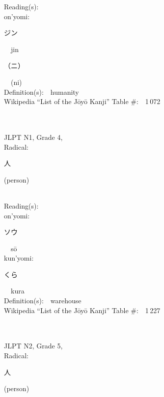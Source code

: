 \begin{multicols}{2}
Reading(s):\ \ \\
{\hspace*{1em}}on'yomi:\ \ \\
{\hspace*{2em}}{\begin{CJK}{UTF8}{min} ジン \end{CJK}}\ \ jin\ \ \\
{\hspace*{2em}}{\begin{CJK}{UTF8}{min} （ニ） \end{CJK}}\ \ (ni)\ \ \\
Definition(s):\ \ humanity \\
Wikipedia ``List of the J\=oy\=o Kanji'' Table \#:\ \ 1\,072 \\
\ \ \\
{\fontsize{34pt}{40pt}  }\ \ \\  %
{JLPT N1, Grade 4, \\Radical:\ \ {\begin{CJK}{UTF8}{min} 人 \end{CJK}} (person) } \\
Reading(s):\ \ \\
{\hspace*{1em}}on'yomi:\ \ \\
{\hspace*{2em}}{\begin{CJK}{UTF8}{min} ソウ \end{CJK}}\ \ s\=o\ \ \\
{\hspace*{1em}}kun'yomi:\ \ \\
{\hspace*{2em}}{\begin{CJK}{UTF8}{min} くら \end{CJK}}\ \ kura\ \ \\
Definition(s):\ \ warehouse \\
Wikipedia ``List of the J\=oy\=o Kanji'' Table \#:\ \ 1\,227 \\
\ \ \\
{\fontsize{34pt}{40pt}  }\ \ \\  %
{JLPT N2, Grade 5, \\Radical:\ \ {\begin{CJK}{UTF8}{min} 人 \end{CJK}} (person) } \\

\end{multicols}
